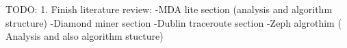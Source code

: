 TODO:
1. Finish literature review:
    -MDA lite section (analysis and algorithm structure)
    -Diamond miner section
    -Dublin traceroute section
    -Zeph algrothim ( Analysis and also algorithm stucture)
